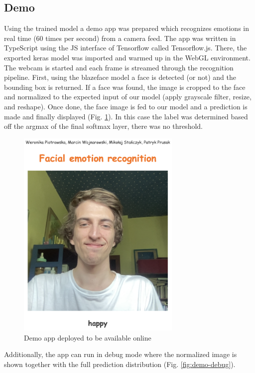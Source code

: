 \documentclass{ledger}
\begin{document}
\subsection{Demo}

Using the trained model a demo app was prepared which recognizes emotions in real time (60 times per second) from a camera feed. The app was written in TypeScript using the JS interface of Tensorflow called Tensorflow.js. There, the exported keras model was imported and warmed up in the WebGL environment. The webcam is started and each frame is streamed through the recognition pipeline. First, using the blazeface model\cite{https://doi.org/10.48550/arxiv.1907.05047} a face is detected (or not) and the bounding box is returned. If a face was found, the image is cropped to the face and normalized to the expected input of our model (apply grayscale filter, resize, and reshape). Once done, the face image is fed to our model and a prediction is made and finally displayed (Fig. \ref{fig:demo}). In this case the label was determined based off the argmax of the final softmax layer, there was no threshold.

\begin{figure}[H]
	\centering
	\includegraphics[width=0.7\textwidth]{assets/demo.png}
	\caption{Demo app deployed to be available online}
	\label{fig:demo}
\end{figure}

Additionally, the app can run in debug mode where the normalized image is shown together with the full prediction distribution (Fig. \ref{fig:demo-debug}).
\end{document}
